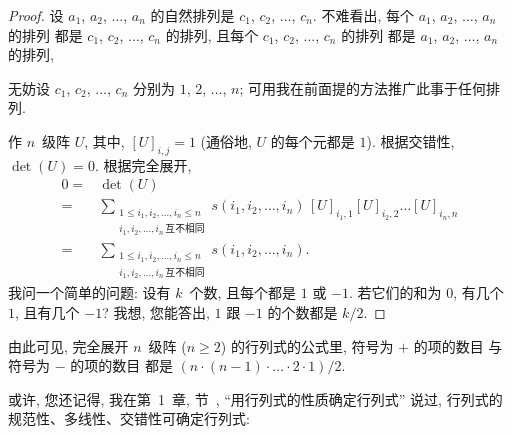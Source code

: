 \documentclass[../libro.tex]{subfiles}
\begin{document}
\begin{proof}
    设 \(a_1\), \(a_2\), \(\dots\), \(a_n\)
    的自然排列是 \(c_1\), \(c_2\), \(\dots\), \(c_n\).
    不难看出,
    每个 \(a_1\), \(a_2\), \(\dots\), \(a_n\) 的排列%
    都是 \(c_1\), \(c_2\), \(\dots\), \(c_n\) 的排列,
    且每个 \(c_1\), \(c_2\), \(\dots\), \(c_n\) 的排列%
    都是 \(a_1\), \(a_2\), \(\dots\), \(a_n\) 的排列,

    无妨设 \(c_1\), \(c_2\), \(\dots\), \(c_n\)
    分别为 \(1\), \(2\), \(\dots\), \(n\);
    可用我在前面提的方法推广此事于任何排列.

    作 \(n\)~级阵 \(U\),
    其中, \([U]_{i,j} = 1\)
    (通俗地, \(U\) 的每个元都是 \(1\)).
    根据交错性, \(\det {(U)} = 0\).
    根据完全展开,
    \begin{align*}
        0
        = {} & \det {(U)}
        \\
        = {} & \sum_{\substack{
                1 \leq i_1, i_2, \dots, i_n \leq n \\
                i_1, i_2, \dots, i_n\,\text{互不相同}
        }}
        {s(i_1, i_2, \dots, i_n)\,
        [U]_{i_1,1} [U]_{i_2,2} \dots [U]_{i_n,n}}
        \\
        = {} & \sum_{\substack{
                1 \leq i_1, i_2, \dots, i_n \leq n \\
                i_1, i_2, \dots, i_n\,\text{互不相同}
        }}
        {s(i_1, i_2, \dots, i_n)}.
    \end{align*}
    我问一个简单的问题:
    设有 \(k\)~个数, 且每个都是 \(1\) 或 \(-1\).
    若它们的和为 \(0\),
    有几个 \(1\), 且有几个 \(-1\)?
    我想, 您能答出,
    \(1\) 跟 \(-1\) 的个数都是 \(k/2\).
\end{proof}

由此可见,
完全展开 \(n\)~级阵 (\(n \geq 2\)) 的行列式的公式里,
符号为 \(+\) 的项的数目%
与符号为 \(-\) 的项的数目%
都是
\((n \cdot (n - 1) \cdot \dots \cdot 2 \cdot 1)/2\).

\vspace{2ex}


或许, 您还记得,
我在第~1~章, 节~,
``用行列式的性质确定行列式'' 说过,
行列式的规范性、多线性、交错性可确定行列式:
\end{document}
